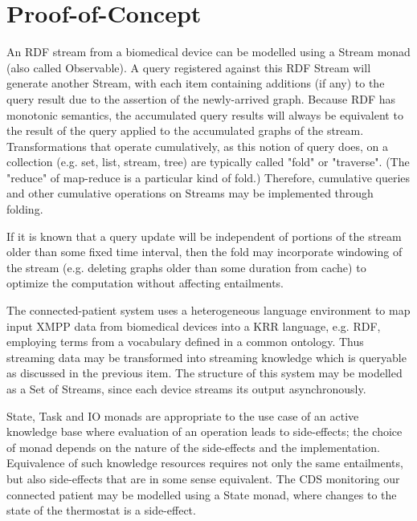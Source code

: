 \documentclass[runningheads]{llncs}
\begin{document}

\section{Proof-of-Concept}


An RDF stream from a biomedical device can be modelled using a Stream monad (also called Observable).
A query registered against this RDF Stream will generate another Stream, with each item containing additions (if any) to the query result due to the assertion of the newly-arrived graph.
Because RDF has monotonic semantics, the accumulated query results will always be equivalent to the result of the query applied to the accumulated graphs of the stream.
Transformations that operate cumulatively, as this notion of query does, on a collection (e.g. set, list, stream, tree) are typically called "fold" or "traverse". (The "reduce" of map-reduce is a particular kind of fold.)
Therefore, cumulative queries and other cumulative operations on Streams may be implemented through folding.

If it is known that a query update will be independent of portions of the stream older than some fixed time interval, then
the fold may incorporate windowing of the stream (e.g. deleting graphs older than some duration from cache) to optimize the computation without affecting entailments.

The connected-patient system uses a heterogeneous language environment to map input XMPP data from biomedical devices into a KRR language, e.g. RDF, employing terms from a vocabulary defined in a common ontology. Thus streaming data may be transformed into streaming knowledge which is queryable as discussed in the previous item. The structure of this system may be modelled as a Set of Streams, since each device streams its output asynchronously.

State, Task and IO monads are appropriate to the use case of an active knowledge base where evaluation of an operation leads to side-effects; the choice of monad depends on the nature of the side-effects and the implementation.
Equivalence of such knowledge resources requires not only the same entailments, but also side-effects that are in some sense equivalent.
The CDS monitoring our connected patient may be modelled using a State monad, where changes to the state of the thermostat is a side-effect.
\end{document}
